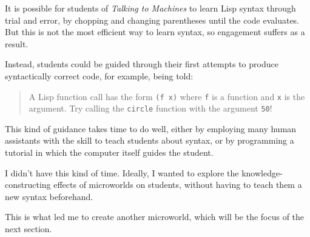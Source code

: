 It is possible for students of \emph{Talking to Machines} to learn Lisp syntax through trial and error, by
chopping and changing parentheses until the code evaluates. But this is
not the most efficient way to learn syntax, so engagement suffers as a
result.

Instead, students could be guided through their first attempts to
produce syntactically correct code, for example, being told: 

\begin{quote}
A Lisp function call has the form \texttt{(f x)} where \texttt{f} is a function and \texttt{x} is the argument. Try calling the \texttt{circle} function with the argument \texttt{50}!
\end{quote}

This kind of guidance takes time to do well, either by employing many
human assistants with the skill to teach students about syntax, or by
programming a tutorial in which the computer itself guides the student.

I didn't have this kind of time. Ideally, I wanted to explore the
knowledge-constructing effects of microworlds on students, without
having to teach them a new syntax beforehand.

This is what led me to create another microworld, which will be the focus of the next section.
